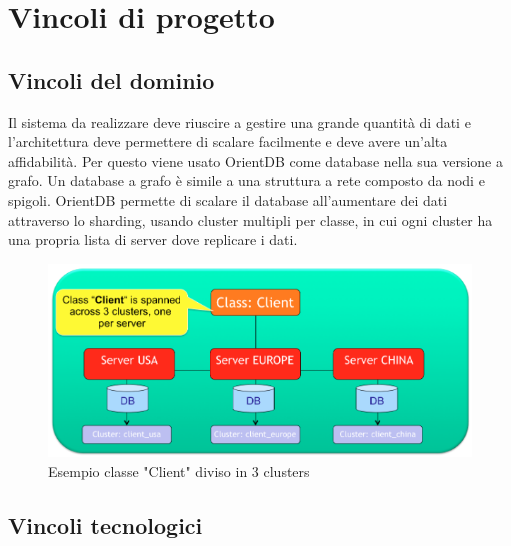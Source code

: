 \section{Vincoli di progetto}

\subsection{Vincoli del dominio}
Il sistema da realizzare deve riuscire a gestire una grande quantità di dati e l'architettura deve permettere di scalare facilmente e deve avere un'alta affidabilità. Per questo viene usato OrientDB come database nella sua versione a grafo. Un database a grafo è simile a una struttura a rete composto da nodi e spigoli. OrientDB permette di scalare il database all'aumentare dei dati attraverso lo sharding, usando cluster multipli per classe, in cui ogni cluster ha una propria lista di server dove replicare i dati.
\begin{figure}[h]
\centering
\includegraphics[width=0.7\linewidth]{immagini/distributed-sharding-class}
\caption[Esempio classe "Client" diviso in 3 clusters]{Esempio classe "Client" diviso in 3 clusters}
\label{fig:distributed-sharding-class}
\end{figure}

\subsection{Vincoli tecnologici}
